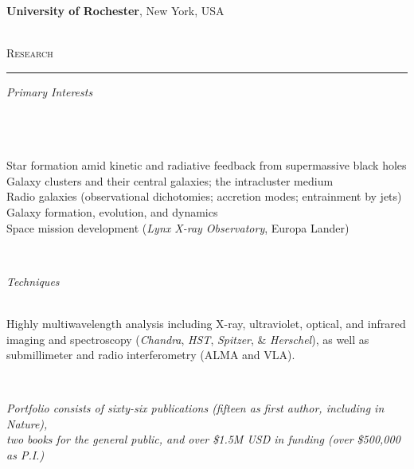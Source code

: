 \documentclass[11pt]{article}
\makeatletter
\def\vhrulefill#1{\leavevmode\leaders\hrule\@height#1\hfill \kern\z@}
\makeatother
\begin{document}
\hspace{42mm} \parbox{5.15in}{\textbf{University of Rochester}, New York, USA} \\



\textsc{Research}  \vhrulefill{0.4pt}

\vspace{4mm}

\hspace{2.5mm} \parbox{1.5in}{\textit{Primary Interests \\\\\\\\}} \parbox{5.15in}{Star formation amid kinetic and radiative feedback from supermassive black holes \\ Galaxy clusters and their central galaxies; the intracluster medium \\ Radio galaxies (observational dichotomies; accretion modes; entrainment by jets) \\ Galaxy formation, evolution, and dynamics \\ Space mission development (\textit{Lynx X-ray Observatory}, Europa Lander)} \\


\vspace{4mm}

\hspace{2.5mm} \parbox{1.5in}{\textit{Techniques \\\\}} \parbox{5.15in}{Highly multiwavelength analysis including X-ray, ultraviolet, optical, and infrared imaging and spectroscopy (\textit{Chandra}, \textit{HST}, \textit{Spitzer}, \& \textit{Herschel}), as well as submillimeter and radio interferometry (ALMA and VLA).  } \\

\vspace*{-2mm}

\begin{center}
\textit{Portfolio consists of sixty-six publications (fifteen as first author, including in Nature), \\ two books for the general public, and over \$1.5M USD in funding (over \$500,000 as P.I.) }  \\
\end{center}
\end{document}
